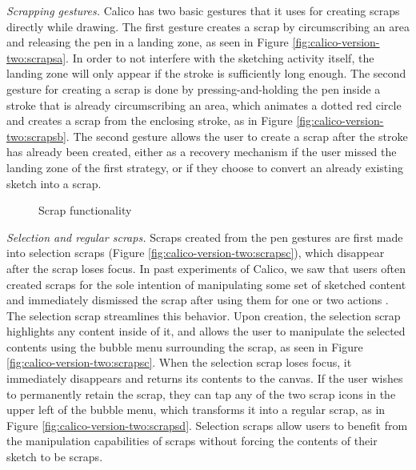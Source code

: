 \emph{Scrapping gestures.} Calico has two basic gestures that it uses for creating scraps directly while drawing. The first gesture creates a scrap by circumscribing an area and releasing the pen in a landing zone, as seen in Figure \ref{fig:calico-version-two:scrapsa}. In order to not interfere with the sketching activity itself, the landing zone will only appear if the stroke is sufficiently long enough. The second gesture for creating a scrap is done by pressing-and-holding the pen inside a stroke that is already circumscribing an area, which animates a dotted red circle and creates a scrap from the enclosing stroke, as in Figure \ref{fig:calico-version-two:scrapsb}. The second gesture allows the user to create a scrap after the stroke has already been created, either as a recovery mechanism if the user missed the landing zone of the first strategy, or if they choose to convert an already existing sketch into a scrap. 

\begin{figure}%
  \centering
   \caption {Scrap functionality}
   \label{fig:calico-version-two:scraps}
\end{figure}%

\emph{Selection and regular scraps.} Scraps created from the pen gestures are first made into selection scraps (Figure \ref{fig:calico-version-two:scrapsc}), which disappear after the scrap loses focus. In past experiments of Calico, we saw that users often created scraps for the sole intention of manipulating some set of sketched content and immediately dismissed the scrap after using them for one or two actions \cite{mangano2012design}. The selection scrap streamlines this behavior. Upon creation, the selection scrap highlights any content inside of it, and allows the user to manipulate the selected contents using the bubble menu surrounding the scrap, as seen in Figure \ref{fig:calico-version-two:scrapsc}. When the selection scrap loses focus, it immediately disappears and returns its contents to the canvas. If the user wishes to permanently retain the scrap, they can tap any of the two scrap icons in the upper left of the bubble menu, which transforms it into a regular scrap, as in Figure \ref{fig:calico-version-two:scrapsd}. Selection scraps allow users to benefit from the manipulation capabilities of scraps without forcing the contents of their sketch to be scraps.

